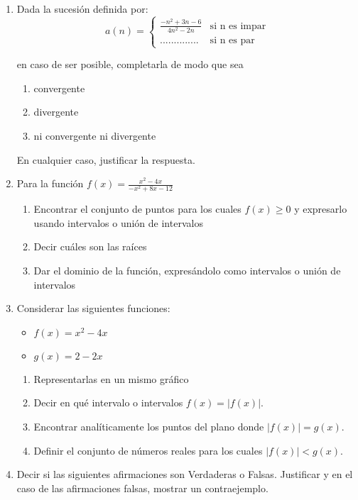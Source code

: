 \documentclass[12pt]{article}
\begin{document}
\begin{enumerate}
\item  
Dada la sucesión definida por:
\begin{equation*}
a(n) =
\begin{cases} 
  \frac{-n^2+3n-6}{4n^2-2n}  & \text{si  n es impar} \\
..............& \text{si  n es par}
\end{cases}
\end{equation*}

en caso de ser posible, completarla de modo que sea

 \begin{enumerate}
        \item convergente
        \item divergente
        \item ni convergente ni divergente
\end{enumerate}
En cualquier caso, justificar la respuesta.

\item  
Para la función $f(x) = \frac{x^2-4x}{-x^2+8x-12}$
\begin{enumerate}
	\item Encontrar el conjunto de puntos para los cuales $f(x) \geq 0$ y expresarlo usando intervalos o unión de intervalos
	\item Decir cuáles son las raíces
	\item Dar el dominio de la función, expresándolo como intervalos o unión de intervalos
\end{enumerate}

\item  
Considerar las siguientes  funciones:
\begin{itemize}
	\item  $f(x) = x^2-4x$
	\item  $g(x) = 2-2x$
\end{itemize}
\begin{enumerate}
	\item Representarlas en un mismo gráfico
	\item Decir en qué intervalo o intervalos $f(x) = |f(x)|$.
	\item Encontrar analíticamente los puntos del plano donde  $|f(x)| = g(x)$.
	\item Definir el conjunto de números reales para los cuales $|f(x)|< g(x)$.
\end{enumerate}

\item  
Decir si las siguientes afirmaciones son Verdaderas  o Falsas. Justificar y en el caso de las afirmaciones falsas, mostrar un contraejemplo.


\end{enumerate}
\end{document}
